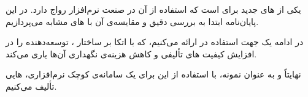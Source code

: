  یکی از ‌های جدید برای 
است که استفاده از آن در صنعت نرم‌افزار رواج دارد. در این پایان‌نامه ابتدا
به بررسی دقیق  و مقایسه‌ی آن با ‌های مشابه
می‌پردازیم.

در ادامه یک   جهت استفاده در   ارائه می‌کنیم، که با اتکا بر  ساختار ، توسعه‌دهنده را در افزایش کیفیت ‌های تألیفی و کاهش هزینه‌ی نگهداری آن‌ها یاری می‌کند.

نهایتاً و به عنوان نمونه، با استفاده از این   برای یک سامانه‌ی کوچک نرم‌افزاری، ‌هایی تألیف می‌کنیم.
